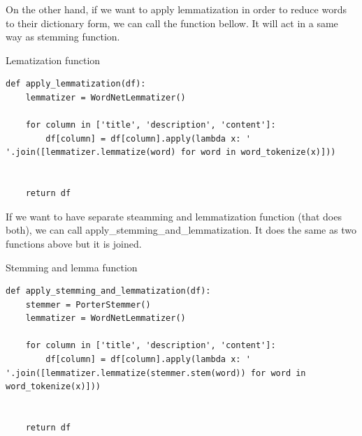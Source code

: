 On the other hand, if we want to apply lemmatization \parencite{plisson2004rule} in order to reduce words to their dictionary form, we can call the function bellow. It will act in a same way as stemming function.
\begin{listing}[H]
\caption{Lematization function}
\begin{verbatim}
def apply_lemmatization(df):
    lemmatizer = WordNetLemmatizer()

    for column in ['title', 'description', 'content']:
        df[column] = df[column].apply(lambda x: ' '.join([lemmatizer.lemmatize(word) for word in word_tokenize(x)]))


    return df
\end{verbatim}
\end{listing}

If we want to have separate steamming and lemmatization function (that does both), we can call apply\_stemming\_and\_lemmatization. It does the same as two functions above but it is joined.
\begin{listing}[H]
\caption{Stemming and lemma function}
\begin{verbatim}
def apply_stemming_and_lemmatization(df):
    stemmer = PorterStemmer()
    lemmatizer = WordNetLemmatizer()

    for column in ['title', 'description', 'content']:
        df[column] = df[column].apply(lambda x: ' '.join([lemmatizer.lemmatize(stemmer.stem(word)) for word in word_tokenize(x)]))


    return df
\end{verbatim}
\end{listing}

